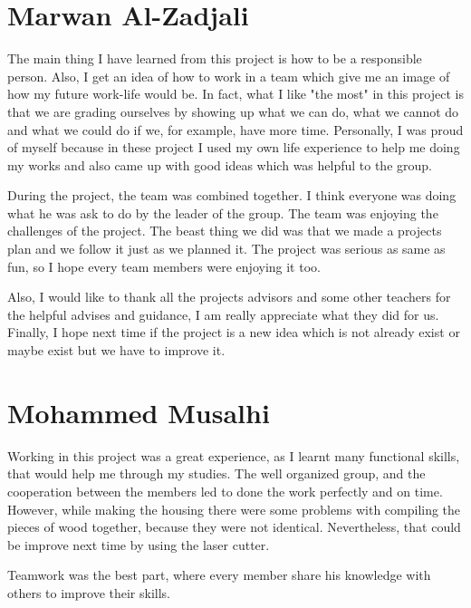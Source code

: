 \section{Marwan Al-Zadjali}
The main thing I have learned from this project is how to be a responsible person.
Also, I get an idea of how to work in a team which give me an image of how my future work-life would be.
In fact, what I like "the most" in this project is that we are grading ourselves by showing up what we can do, what we cannot do and what we could do if we, for example, have more time.
Personally, I was proud of myself because in these project I used my own life experience to help me doing my works and also came up with good ideas which was helpful to the group.

During the project, the team was combined together.
I think everyone was doing what he was ask to do by the leader of the group.
The team was enjoying the challenges of the project.
The beast thing we did was that we made a projects plan and we follow it just as we planned it.
The project was serious as same as fun, so I hope every team members were enjoying it too.

Also, I would like to thank all the projects advisors and some other teachers for the helpful advises and guidance, I am really appreciate what they did for us.
Finally, I hope next time if the project is a new idea which is not already exist or maybe exist but we have to improve it.

\section{Mohammed Musalhi}
Working in this project was a great experience, as I learnt many functional skills, that would help me through my studies.
The well organized group, and the cooperation between the members led to done the work perfectly and on time.
However, while making the housing there were some problems with compiling the pieces of wood together, because they were not identical.
Nevertheless, that could be improve next time by using the laser cutter.

Teamwork was the best part, where every member share his knowledge with others to improve their skills.

